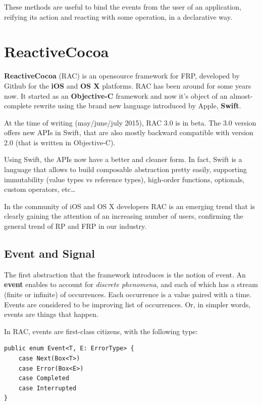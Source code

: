 These methods are useful to bind the events from the user of an
application, reifying its action and reacting with some operation, in a
declarative way.

\section{ReactiveCocoa}\label{reactivecocoa}

\textbf{ReactiveCocoa} (RAC) is an opensource framework for FRP,
developed by Github for the \textbf{iOS} and \textbf{OS X} platforms.
RAC has been around for some years now. It started as an
\textbf{Objective-C} framework and now it's object of an almost-complete
rewrite using the brand new language introduced by Apple,
\textbf{Swift}.

At the time of writing (may/june/july 2015), RAC 3.0 is in beta. The 3.0
version offers new APIs in Swift, that are also mostly backward
compatible with version 2.0 (that is written in Objective-C).

Using Swift, the APIs now have a better and cleaner form. In fact, Swift
is a language that allows to build composable abstraction pretty easily,
supporting immutability (value types vs reference types), high-order
functions, optionals, custom operators, etc\ldots{}

In the community of iOS and OS X developers RAC is an emerging trend
that is clearly gaining the attention of an increasing number of users,
confirming the general trend of RP and FRP in our industry.


\subsection{Event and Signal}\label{event-and-signal}

The first abstraction that the framework introduces is the notion of
event. An \textbf{event} enables to account for \emph{discrete
phenomena}, and each of which has a stream (finite or infinite) of
occurrences. Each occurrence is a value paired with a time.
Events are considered to be improving list of occurrences. Or, in simpler
words, events are things that happen.

In RAC, events are first-class citizens, with the following type:

\begin{verbatim}
public enum Event<T, E: ErrorType> {
    case Next(Box<T>)
    case Error(Box<E>)
    case Completed
    case Interrupted
}
\end{verbatim}

